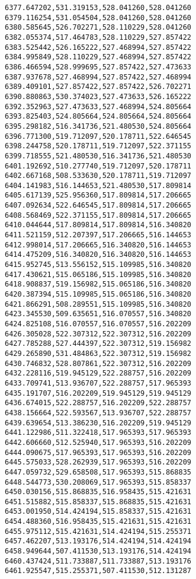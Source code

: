 \documentclass[11pt]{article}
\begin{document}
\begin{Verbatim}[commandchars=\\\{\}]
6377.647202,531.319153,528.041260,528.041260
6379.116254,531.054504,528.041260,528.041260
6380.585645,526.702271,528.110229,528.041260
6382.055374,517.464783,528.110229,527.857422
6383.525442,526.165222,527.468994,527.857422
6384.995849,528.110229,527.468994,527.857422
6386.466594,528.999695,527.857422,527.473633
6387.937678,527.468994,527.857422,527.468994
6389.409101,527.857422,527.857422,526.702271
6390.880863,530.374023,527.473633,526.165222
6392.352963,527.473633,527.468994,524.805664
6393.825403,524.805664,524.805664,524.805664
6395.298182,516.341736,521.480530,524.805664
6396.771300,519.712097,520.178711,522.646545
6398.244758,520.178711,519.712097,522.371155
6399.718555,521.480530,516.341736,521.480530
6401.192692,510.277740,519.712097,520.178711
6402.667168,508.533630,520.178711,519.712097
6404.141983,516.144653,521.480530,517.809814
6405.617139,525.956360,517.809814,517.206665
6407.092634,522.646545,517.809814,517.206665
6408.568469,522.371155,517.809814,517.206665
6410.044644,517.809814,517.809814,516.340820
6411.521159,512.207397,517.206665,516.144653
6412.998014,517.206665,516.340820,516.144653
6414.475209,516.340820,516.340820,516.144653
6415.952745,513.556152,515.109985,516.340820
6417.430621,515.065186,515.109985,516.340820
6418.908837,519.156982,515.065186,516.340820
6420.387394,515.109985,515.065186,516.340820
6421.866291,508.289551,515.109985,516.340820
6423.345530,509.635651,516.070557,516.340820
6424.825108,516.070557,516.070557,516.202209
6426.305028,522.307312,522.307312,516.202209
6427.785288,527.444397,522.307312,519.156982
6429.265890,531.484863,522.307312,519.156982
6430.746832,528.807861,522.307312,516.202209
6432.228116,519.945129,522.288757,516.202209
6433.709741,513.936707,522.288757,517.965393
6435.191707,516.202209,519.945129,519.945129
6436.674015,522.288757,516.202209,522.288757
6438.156664,522.593567,513.936707,522.288757
6439.639654,513.386230,516.202209,519.945129
6441.122986,511.322418,517.965393,517.965393
6442.606660,512.525940,517.965393,516.202209
6444.090675,517.965393,517.965393,516.202209
6445.575033,528.262939,517.965393,516.202209
6447.059732,529.658508,517.965393,515.868835
6448.544773,530.208069,517.965393,515.858337
6450.030156,515.868835,516.958435,515.421631
6451.515882,515.858337,515.868835,515.421631
6453.001950,514.424194,515.858337,515.421631
6454.488360,516.958435,515.421631,515.421631
6455.975112,515.421631,514.424194,515.255371
6457.462207,513.193176,514.424194,514.424194
6458.949644,507.411530,513.193176,514.424194
6460.437424,511.733887,511.733887,513.193176
6461.925547,515.255371,507.411530,512.131287

\end{Verbatim}
\end{document}
